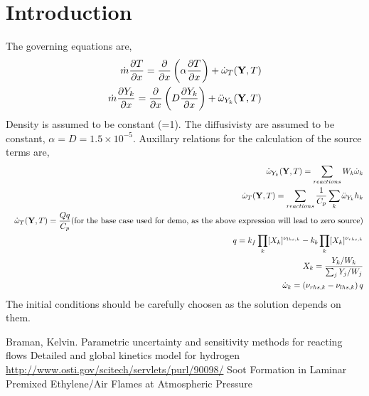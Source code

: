 \documentclass[%
notitlepage,
]{revtex4-1}
\newcommand{\pd}[2]{\frac{\partial #1}{\partial #2}}
\newcommand{\mat}[1]{{\ensuremath{\bf{ #1}}}}
\begin{document}
\section{Introduction}
The governing equations are,
\begin{eqnarray}
  \dot{m}\pd{T}{x} = \pd{}{x}\left(\alpha\pd{T}{x}\right) + \dot{\omega}_T(\mat{Y}, T)\\
  \dot{m}\pd{Y_{k}}{x} = \pd{}{x}\left(D\pd{Y_{k}}{x}\right) + \ddot{\omega}_{Y_k}(\mat{Y}, T)\\
\end{eqnarray}
Density is assumed to be constant (=1). The diffusivisty are assumed to be constant, $\alpha = D = 1.5\times 10^{-5}$. Auxillary relations for the calculation of the source terms are,
\begin{eqnarray}
&&  \ddot{\omega}_{Y_k}(\mat{Y}, T) = \sum_{reactions}W_{k}\dot{\omega}_k\\ 
&&  \dot{\omega}_T(\mat{Y}, T) = \sum_{reactions}\frac{1}{C_p}\sum_{k}\ddot{\omega}_{Y_k}h_k\\
&&  \dot{\omega}_T(\mat{Y}, T) = \frac{Q q}{C_p} \text{(for the base case used for demo, as the above expression will lead to zero source)}\\
&&  q = k_f\prod_k [X_k]^{\nu_{lhs,k}} - k_b\prod_k [X_k]^{\nu_{rhs,k}}\\
&&  X_k = \frac{Y_k/W_k}{\sum_j Y_j/W_j}\\
&&  \dot{\omega}_{k} = \left(\nu_{rhs,k} - \nu_{lhs,k}\right)q
\end{eqnarray}
The initial conditions should be carefully choosen as the solution depends on them.
\begin{thebibliography}{50}
 Braman, Kelvin. Parametric uncertainty and sensitivity methods for reacting flows
 Detailed and global kinetics model for hydrogen \url{http://www.osti.gov/scitech/servlets/purl/90098/}
 Soot Formation in Laminar Premixed Ethylene/Air Flames at Atmospheric Pressure 
\end{thebibliography}
\end{document}
